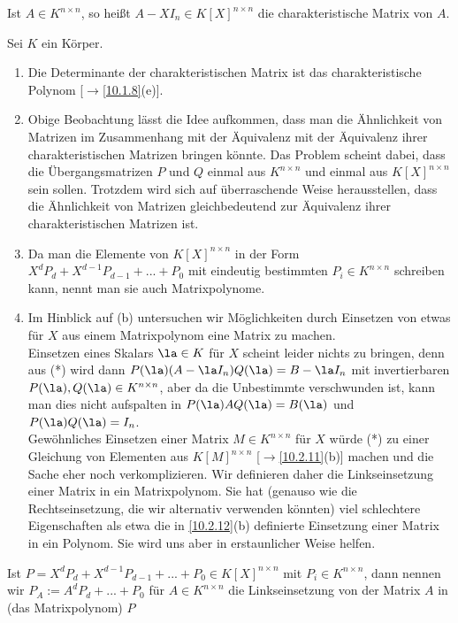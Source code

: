 \documentclass[../../main.tex]{subfiles}
\begin{document}
\begin{df}\label{17.4.3}
Ist $A\in K^{n\times n}$, so heißt $A-XI_n\in K[X]^{n\times n}$ die charakteristische Matrix von $A$.
\end{df}

\begin{bem}\label{17.4.4}
Sei $K$ ein Körper.
\begin{enumerate}[\normalfont(a)]
\item Die Determinante der charakteristischen Matrix ist das charakteristische Polynom [$\to$\ref{10.1.8}(e)].
\item Obige Beobachtung lässt die Idee aufkommen, dass man die Ähnlichkeit von Matrizen im Zusammenhang mit der Äquivalenz mit der Äquivalenz ihrer charakteristischen Matrizen bringen könnte. Das Problem scheint dabei, dass die Übergangsmatrizen $P$ und $Q$ einmal aus $K^{n\times n}$ und einmal aus $K[X]^{n\times n}$ sein sollen. Trotzdem wird sich auf überraschende Weise herausstellen, dass die Ähnlichkeit von Matrizen gleichbedeutend zur Äquivalenz ihrer charakteristischen Matrizen ist.
\item Da man die Elemente von $K[X]^{n\times n}$ in der Form $X^dP_d+X^{d-1}P_{d-1}+...+P_0$ mit eindeutig bestimmten $P_i\in K^{n\times n}$ schreiben kann, nennt man sie auch Matrixpolynome.
\item Im Hinblick auf (b) untersuchen wir Möglichkeiten durch Einsetzen von etwas für $X$ aus einem Matrixpolynom eine Matrix zu machen. 
\\Einsetzen eines Skalars $\la\in K$ für $X$ scheint leider nichts zu bringen, denn aus (*) wird dann $P(\la)(A-\la I_n)Q(\la)=B-\la I_n$ mit invertierbaren $P(\la),Q(\la)\in K^{n\times n}$, aber da die Unbestimmte verschwunden ist, kann man dies nicht aufspalten in $P(\la)AQ(\la)=B(\la)$ und $P(\la)Q(\la)=I_n$. 
\\Gewöhnliches Einsetzen einer Matrix $M\in K^{n\times n}$ für $X$ würde (*) zu einer Gleichung von Elementen aus $K[M]^{n\times n}$ [$\to$\ref{10.2.11}(b)] machen und die Sache eher noch verkomplizieren. Wir definieren daher die Linkseinsetzung einer Matrix in ein Matrixpolynom. Sie hat (genauso wie die Rechtseinsetzung, die wir alternativ verwenden könnten) viel schlechtere Eigenschaften als etwa die in \ref{10.2.12}(b) definierte Einsetzung einer Matrix in ein Polynom. Sie wird uns aber in erstaunlicher Weise helfen.
\end{enumerate}
\end{bem}

\begin{df}\label{17.4.5}
Ist $P=X^dP_d+X^{d-1}P_{d-1}+...+P_0\in K[X]^{n\times n}$ mit $P_i\in K^{n\times n}$, dann nennen wir $P_A:=A^dP_d+...+P_0$ für $A\in K^{n\times n}$ die Linkseinsetzung von der Matrix $A$ in (das Matrixpolynom) $P$
\end{df}
\end{document}
